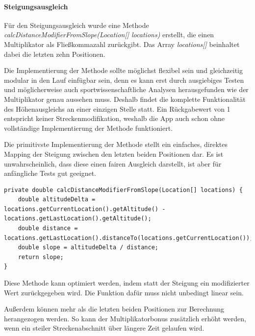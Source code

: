 \paragraph{Steigungsausgleich}
Für den Steigungsausgleich wurde eine Methode  \textit{calcDistanceModifierFromSlope(Location[] locations)} erstellt, die einen Multiplikator als Fließkommazahl zurückgibt. Das Array \textit{locations[]} beinhaltet dabei die letzten zehn Positionen.

Die Implementierung der Methode sollte möglichst flexibel sein und gleichzeitig modular in den Lauf einfügbar sein, denn es kann erst durch ausgiebiges Testen und möglicherweise auch sportwissenschaftliche Analysen herausgefunden wie der Multiplikator genau aussehen muss. Deshalb findet die komplette Funktionalität des Höhenausgleichs an einer einzigen Stelle statt. Ein Rückgabewert von 1 entspricht keiner Streckenmodifikation, weshalb die App auch schon ohne vollständige Implementierung der Methode funktioniert.

Die primitivste Implementierung der Methode stellt ein einfaches, direktes Mapping der Steigung zwischen den letzten beiden Positionen dar. Es ist unwahrscheinlich, dass diese einen fairen Ausgleich darstellt, ist aber für anfängliche Tests gut geeignet.
\lstset{language=java}
\begin{lstlisting}[frame=htrbl, caption={Primitive Implementierung der Methode}, breaklines=true]
private double calcDistanceModifierFromSlope(Location[] locations) {
	double altitudeDelta = locations.getCurrentLocation().getAltitude() - locations.getLastLocation().getAltitude();
	double distance = locations.getLastLocation().distanceTo(locations.getCurrentLocation());
	double slope = altitudeDelta / distance;
	return slope;
}
\end{lstlisting}

Diese Methode kann optimiert werden, indem statt der Steigung ein modifizierter Wert zurückgegeben wird. Die Funktion dafür muss nicht unbedingt linear sein.

Außerdem können mehr als die letzten beiden Positionen zur Berechnung herangezogen werden. So kann der Multiplikatorbonus zusätzlich erhöht werden, wenn ein steiler Streckenabschnitt über längere Zeit gelaufen wird.
